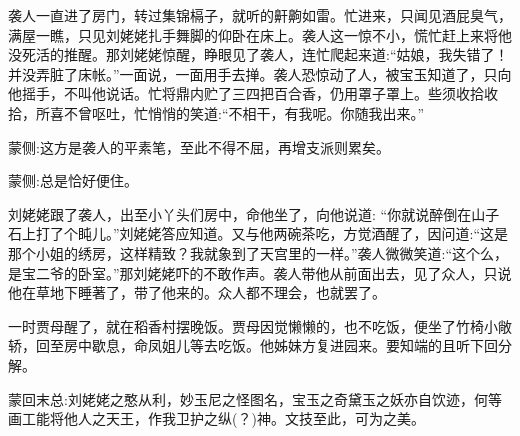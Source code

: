 \begin{parag}
    袭人一直进了房门，转过集锦槅子，就听的鼾齁如雷。忙进来，只闻见酒屁臭气，满屋一瞧，只见刘姥姥扎手舞脚的仰卧在床上。袭人这一惊不小，慌忙赶上来将他没死活的推醒。那刘姥姥惊醒，睁眼见了袭人，连忙爬起来道:“姑娘，我失错了！并没弄脏了床帐。”一面说，一面用手去掸。袭人恐惊动了人，被宝玉知道了，只向他摇手，不叫他说话。忙将鼎内贮了三四把百合香，仍用罩子罩上。些须收拾收拾，所喜不曾呕吐，忙悄悄的笑道:“不相干，有我呢。你随我出来。”\begin{note}蒙侧:这方是袭人的平素笔，至此不得不屈，再增支派则累矣。\end{note}\begin{note}蒙侧:总是恰好便住。\end{note}刘姥姥跟了袭人，出至小丫头们房中，命他坐了，向他说道: “你就说醉倒在山子石上打了个盹儿。”刘姥姥答应知道。又与他两碗茶吃，方觉酒醒了，因问道:“这是那个小姐的绣房，这样精致？我就象到了天宫里的一样。”袭人微微笑道:“这个么，是宝二爷的卧室。”那刘姥姥吓的不敢作声。袭人带他从前面出去，见了众人，只说他在草地下睡著了，带了他来的。众人都不理会，也就罢了。
\end{parag}


\begin{parag}
    一时贾母醒了，就在稻香村摆晚饭。贾母因觉懒懒的，也不吃饭，便坐了竹椅小敞轿，回至房中歇息，命凤姐儿等去吃饭。他姊妹方复进园来。要知端的且听下回分解。
\end{parag}


\begin{parag}
    \begin{note}蒙回末总:刘姥姥之憨从利，妙玉尼之怪图名，宝玉之奇黛玉之妖亦自饮迹，何等画工能将他人之天王，作我卫护之纵(？)神。文技至此，可为之美。\end{note}
\end{parag}


